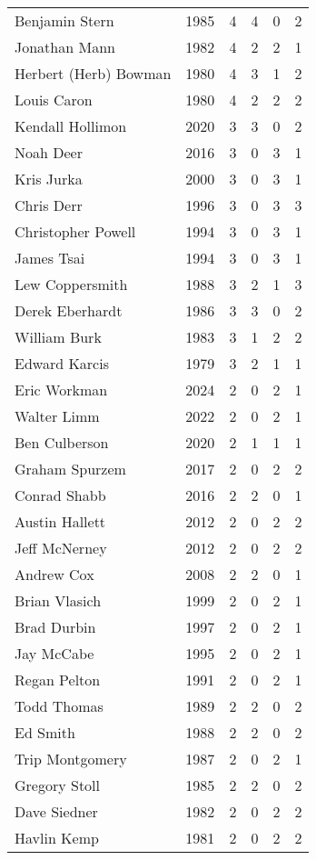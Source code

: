 \begin{longtable}{lccccc}
    Benjamin Stern & 1985 & 4 & 4 & 0 & 2 \\
    Jonathan Mann & 1982 & 4 & 2 & 2 & 1 \\
    Herbert (Herb) Bowman & 1980 & 4 & 3 & 1 & 2 \\
    Louis Caron & 1980 & 4 & 2 & 2 & 2 \\
    Kendall Hollimon & 2020 & 3 & 3 & 0 & 2 \\
    Noah Deer & 2016 & 3 & 0 & 3 & 1 \\
    Kris Jurka & 2000 & 3 & 0 & 3 & 1 \\
    Chris Derr & 1996 & 3 & 0 & 3 & 3 \\
    Christopher Powell & 1994 & 3 & 0 & 3 & 1 \\
    James Tsai & 1994 & 3 & 0 & 3 & 1 \\
    Lew Coppersmith & 1988 & 3 & 2 & 1 & 3 \\
    Derek Eberhardt & 1986 & 3 & 3 & 0 & 2 \\
    William Burk & 1983 & 3 & 1 & 2 & 2 \\
    Edward Karcis & 1979 & 3 & 2 & 1 & 1 \\
    Eric Workman & 2024 & 2 & 0 & 2 & 1 \\
    Walter Limm & 2022 & 2 & 0 & 2 & 1 \\
    Ben Culberson & 2020 & 2 & 1 & 1 & 1 \\
    Graham Spurzem & 2017 & 2 & 0 & 2 & 2 \\
    Conrad Shabb & 2016 & 2 & 2 & 0 & 1 \\
    Austin Hallett & 2012 & 2 & 0 & 2 & 2 \\
    Jeff McNerney & 2012 & 2 & 0 & 2 & 2 \\
    Andrew Cox & 2008 & 2 & 2 & 0 & 1 \\
    Brian Vlasich & 1999 & 2 & 0 & 2 & 1 \\
    Brad Durbin & 1997 & 2 & 0 & 2 & 1 \\
    Jay McCabe & 1995 & 2 & 0 & 2 & 1 \\
    Regan Pelton & 1991 & 2 & 0 & 2 & 1 \\
    Todd Thomas & 1989 & 2 & 2 & 0 & 2 \\
    Ed Smith & 1988 & 2 & 2 & 0 & 2 \\
    Trip Montgomery & 1987 & 2 & 0 & 2 & 1 \\
    Gregory Stoll & 1985 & 2 & 2 & 0 & 2 \\
    Dave Siedner & 1982 & 2 & 0 & 2 & 2 \\
    Havlin Kemp & 1981 & 2 & 0 & 2 & 2 \\

\end{longtable}
